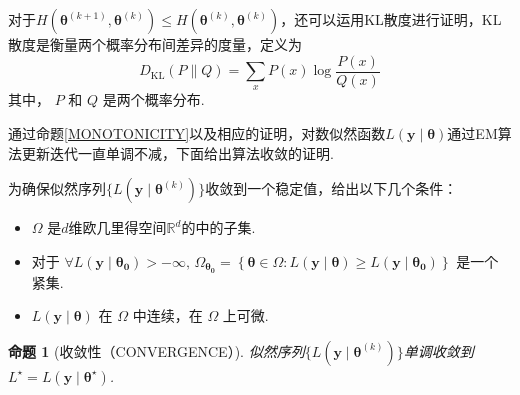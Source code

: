 \documentclass[UTF8,12pt]{ctexart}
\numberwithin{equation}{section}%
\newtheorem{prop}{命题}[section]   %
\begin{document}
	\begin{marker}
		对于$H\left(\boldsymbol{\theta}^{(k+1)} , \boldsymbol{\theta}^{(k)}\right)\le H\left(\boldsymbol{\theta}^{(k)}, \boldsymbol{\theta}^{(k)}\right)$，还可以运用KL散度进行证明，KL散度是衡量两个概率分布间差异的度量，定义为
		$$D_{\mathrm{KL}}(P \| Q)=\sum_x P(x) \log \frac{P(x)}{Q(x)}$$
		其中， $ P $ 和 $ Q $ 是两个概率分布.
	\end{marker}
	通过命题\ref{MONOTONICITY}以及相应的证明，对数似然函数$L(\mathbf{y}\mid \boldsymbol{\theta})$通过EM算法更新迭代一直单调不减，下面给出算法收敛的证明.
	\begin{ascolorbox3}{\citet{wu1983convergence}}
		\citet{wu1983convergence}为确保似然序列$\{L(\mathbf{y}\mid \boldsymbol{\theta}^{(k)})\}$收敛到一个稳定值，给出以下几个条件：
		\begin{itemize}
			\item $\Omega$ 是$d$维欧几里得空间$\mathbb{R}^d$的中的子集.
			\item  对于 $\forall L\left(\mathbf{y} \mid \boldsymbol{\theta_0}\right)>-\infty ,\, \Omega_{\boldsymbol{\theta_0}}=\left\{\boldsymbol{\theta} \in \Omega: L(\mathbf{y} \mid \boldsymbol{\theta}) \ge L\left(\mathbf{y} \mid \boldsymbol{\theta_0}\right)\right\} $ 是一个紧集. 
			\item $L(\mathbf{y}\mid \boldsymbol{\theta})$ 在 $\Omega$ 中连续，在 $\Omega$ 上可微.
		\end{itemize}
	\end{ascolorbox3}
	\begin{prop}[收敛性（CONVERGENCE）]\label{CONVERGENCE}
	似然序列$\{L(\mathbf{y}\mid \boldsymbol{\theta}^{(k)})\}$单调收敛到$L^{\star}=L(\mathbf{y}\mid \boldsymbol{\theta}^{\star})$.
	\end{prop}
	
\end{document}
